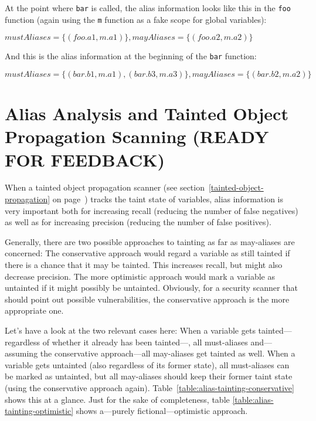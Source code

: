 At the point where \texttt{bar} is called, the alias information looks like this in the \texttt{foo} function (again using the \texttt{m} function as a fake scope for global variables):

$mustAliases = \{(foo.a1, m.a1)\}, mayAliases = \{(foo.a2, m.a2)\}$

And this is the alias information at the beginning of the \texttt{bar} function:

$mustAliases = \{(bar.b1, m.a1), (bar.b3, m.a3)\}, mayAliases = \{(bar.b2, m.a2)\}$




\section{Alias Analysis and Tainted Object Propagation Scanning (READY FOR FEEDBACK)}

When a tainted object propagation scanner (see section~\ref{tainted-object-propagation} on page~\pageref{tainted-object-propagation}) tracks the taint state of variables, alias information is very important both for increasing recall (\ie reducing the number of false negatives) as well as for increasing precision (\ie reducing the number of false positives).

Generally, there are two possible approaches to tainting as far as may-aliases are concerned: The conservative approach would regard a variable as still tainted if there is a chance that it may be tainted. This increases recall, but might also decrease precision. The more optimistic approach would mark a variable as untainted if it might possibly be untainted. Obviously, for a security scanner that should point out possible vulnerabilities, the conservative approach is the more appropriate one.

Let's have a look at the two relevant cases here: When a variable gets tainted---regardless of whether it already has been tainted---, all must-aliases and---assuming the conservative approach---all may-aliases get tainted as well. When a variable gets untainted (also regardless of its former state), all must-aliases can be marked as untainted, but all may-aliases should keep their former taint state (using the conservative approach again). Table~\ref{table:alias-tainting-conservative} shows this at a glance. Just for the sake of completeness, table \ref{table:alias-tainting-optimistic} shows a---purely fictional---optimistic approach.

